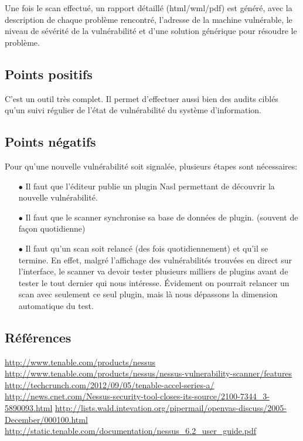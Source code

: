Une fois le scan effectué, un rapport détaillé (html/wml/pdf) est généré, avec la description de chaque problème rencontré, l’adresse de la machine vulnérable, le niveau de sévérité de la vulnérabilité et d’une solution générique pour résoudre le problème.


\subsection{Points positifs}
C’est un outil très complet. Il permet d'effectuer aussi bien des audits ciblés qu’un suivi régulier de l’état de vulnérabilité du système d’information.

\subsection{Points négatifs}
Pour qu’une nouvelle vulnérabilité soit signalée, plusieurs étapes sont nécessaires:\\
\begin{itemize}
\item [$\bullet$]Il faut que l’éditeur publie un plugin Nasl permettant de découvrir la nouvelle vulnérabilité.\\
\item [$\bullet$]Il faut que le scanner synchronise sa base de données de plugin. (souvent de façon quotidienne)\\
\item [$\bullet$]Il faut qu’un scan soit relancé (des fois quotidiennement) et qu’il se termine. En effet, malgré l’affichage des vulnérabilités trouvées en direct sur l’interface, le scanner va devoir tester plusieurs milliers de plugins avant de tester le tout dernier qui nous intéresse. Évidement on pourrait relancer un scan avec seulement ce seul plugin, mais là nous dépassons la dimension automatique du test.
\end{itemize}

\subsection{Références}
\small
\noindent
 [1] \url{http://www.tenable.com/products/nessus} \newline
 [2] \url{http://www.tenable.com/products/nessus/nessus-vulnerability-scanner/features} \newline
 [3] \url{http://techcrunch.com/2012/09/05/tenable-accel-series-a/} \newline
 [3] \url{http://news.cnet.com/Nessus-security-tool-closes-its-source/2100-7344_3-5890093.html} \newline
 [5] \url{http://lists.wald.intevation.org/pipermail/openvas-discuss/2005-December/000100.html} \newline
 [6] \url{http://static.tenable.com/documentation/nessus_6.2_user_guide.pdf} \newline
\normalsize
